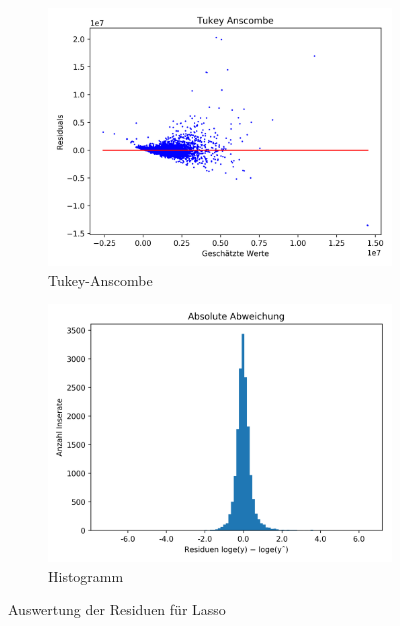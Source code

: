 \begin{figure}[h]
\begin{subfigure}{.5\textwidth}
  \centering
  \includegraphics[width=\linewidth]{images/lasso_tukey.png}
  \caption[Tukey-Anscombe]{Tukey-Anscombe}
  \label{fig:lasso_tukey-anscombe}
\end{subfigure}
\begin{subfigure}{.5\textwidth}
  \centering
  \includegraphics[width=\linewidth]{images/lasso_residuen.png}
  \caption[Histogramm]{Histogramm} %
  \label{fig:lasso_histo}
\end{subfigure}
\caption[Auswertung der Residuen für Lasso]{Auswertung der Residuen für Lasso}
\label{fig:lasso}
\end{figure}


